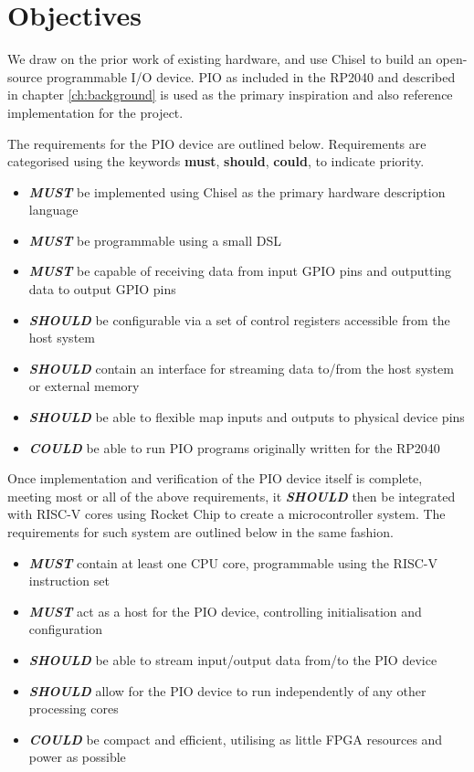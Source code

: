 \chapter{Objectives}
\label{ch:objectives}

We draw on the prior work of existing hardware, and use Chisel to build an open-source programmable I/O device. PIO as included in the RP2040 and described in chapter \ref{ch:background} is used as the primary inspiration and also reference implementation for the project.

The requirements for the PIO device are outlined below. Requirements are categorised using the keywords \textbf{must}, \textbf{should}, \textbf{could}, to indicate priority.

\begin{itemize}
    \item \textit{\textbf{MUST}} be implemented using Chisel as the primary hardware description language
    \item \textit{\textbf{MUST}} be programmable using a small DSL
    \item \textit{\textbf{MUST}} be capable of receiving data from input GPIO pins and outputting data to output GPIO pins
    \item \textit{\textbf{SHOULD}} be configurable via a set of control registers accessible from the host system
    \item \textit{\textbf{SHOULD}} contain an interface for streaming data to/from the host system or external memory
    \item \textit{\textbf{SHOULD}} be able to flexible map inputs and outputs to physical device pins
    \item \textit{\textbf{COULD}} be able to run PIO programs originally written for the RP2040
\end{itemize}

Once implementation and verification of the PIO device itself is complete, meeting most or all of the above requirements, it \textit{\textbf{SHOULD}} then be integrated with RISC-V cores using Rocket Chip to create a microcontroller system. The requirements for such system are outlined below in the same fashion.

\begin{itemize}
    \item \textit{\textbf{MUST}} contain at least one CPU core, programmable using the RISC-V instruction set
    \item \textit{\textbf{MUST}} act as a host for the PIO device, controlling initialisation and configuration
    \item \textit{\textbf{SHOULD}} be able to stream input/output data from/to the PIO device
    \item \textit{\textbf{SHOULD}} allow for the PIO device to run independently of any other processing cores
    \item \textit{\textbf{COULD}} be compact and efficient, utilising as little FPGA resources and power as possible
\end{itemize}

